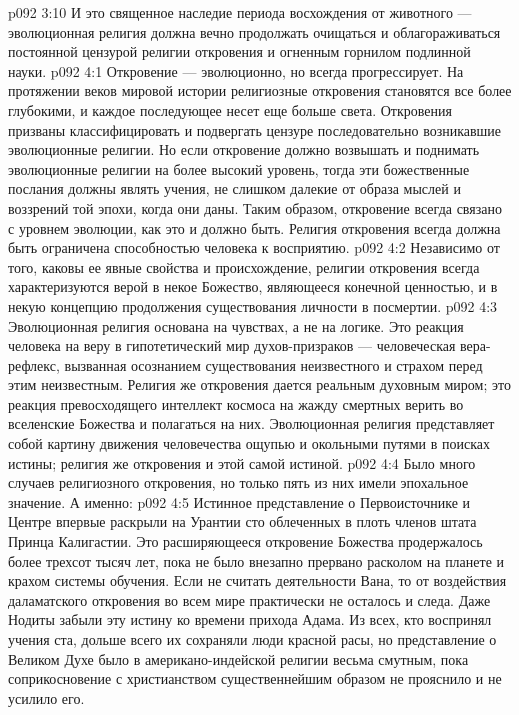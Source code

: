 \vs p092 3:10 И это священное наследие периода восхождения от животного --- эволюционная религия должна вечно продолжать очищаться и облагораживаться постоянной цензурой религии откровения и огненным горнилом подлинной науки.
\vs p092 4:1 Откровение --- эволюционно, но всегда прогрессирует. На протяжении веков мировой истории религиозные откровения становятся все более глубокими, и каждое последующее несет еще больше света. Откровения призваны классифицировать и подвергать цензуре последовательно возникавшие эволюционные религии. Но если откровение должно возвышать и поднимать эволюционные религии на более высокий уровень, тогда эти божественные послания должны являть учения, не слишком далекие от образа мыслей и воззрений той эпохи, когда они даны. Таким образом, откровение всегда связано с уровнем эволюции, как это и должно быть. Религия откровения всегда должна быть ограничена способностью человека к восприятию.
\vs p092 4:2 Независимо от того, каковы ее явные свойства и происхождение, религии откровения всегда характеризуются верой в некое Божество, являющееся конечной ценностью, и в некую концепцию продолжения существования личности в посмертии.
\vs p092 4:3 Эволюционная религия основана на чувствах, а не на логике. Это реакция человека на веру в гипотетический мир духов\hyp{}призраков --- человеческая вера\hyp{}рефлекс, вызванная осознанием существования неизвестного и страхом перед этим неизвестным. Религия же откровения дается реальным духовным миром; это реакция превосходящего интеллект космоса на жажду смертных верить во вселенские Божества и полагаться на них. Эволюционная религия представляет собой картину движения человечества ощупью и окольными путями в поисках истины; религия же откровения и  этой самой истиной.
\vs p092 4:4 \pc Было много случаев религиозного откровения, но только пять из них имели эпохальное значение. А именно:
\vs p092 4:5 \bibnobreakspace {} Истинное представление о Первоисточнике и Центре впервые раскрыли на Урантии сто облеченных в плоть членов штата Принца Калигастии. Это расширяющееся откровение Божества продержалось более трехсот тысяч лет, пока не было внезапно прервано расколом на планете и крахом системы обучения. Если не считать деятельности Вана, то от воздействия даламатского откровения во всем мире практически не осталось и следа. Даже Нодиты забыли эту истину ко времени прихода Адама. Из всех, кто воспринял учения ста, дольше всего их сохраняли люди красной расы, но представление о Великом Духе было в американо\hyp{}индейской религии весьма смутным, пока соприкосновение с христианством существеннейшим образом не прояснило и не усилило его.
